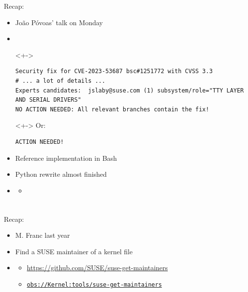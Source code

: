 \begin{frame}[fragile]{Recap: }

  \begin{itemize}[<+->]
    \item João Póvoas' talk on Monday
    \item {} \\
      \begin{uncoverenv}<+->
	\begin{lstlisting}[language={}]
Security fix for CVE-2023-53687 bsc#1251772 with CVSS 3.3
# ... a lot of details ...
Experts candidates:  jslaby@suse.com (1) subsystem/role="TTY LAYER AND SERIAL DRIVERS"
NO ACTION NEEDED: All relevant branches contain the fix!
	\end{lstlisting}
      \end{uncoverenv}
      \begin{uncoverenv}<+->
	Or:
	\begin{lstlisting}[language={}]
ACTION NEEDED!
	\end{lstlisting}
      \end{uncoverenv}
    \item Reference implementation in Bash
    \item Python rewrite almost finished
    \item {}
      \begin{itemize}[<.->]
	\item {}
      \end{itemize}
  \end{itemize}

\end{frame}

\section{}
\frame{\sectionpage}

\begin{frame}{Recap: }

  \begin{itemize}[<+->]
    \item M. Franc last year
    \item Find a SUSE maintainer of a kernel file
    \item {}
      \begin{itemize}[<.->]
	\item \url{https://github.com/SUSE/suse-get-maintainers}
	\item \href{https://build.opensuse.org/package/show/Kernel:tools/suse-get-maintainers}{\nolinkurl{obs://Kernel:tools/suse-get-maintainers}}
      \end{itemize}
  \end{itemize}

\end{frame}


